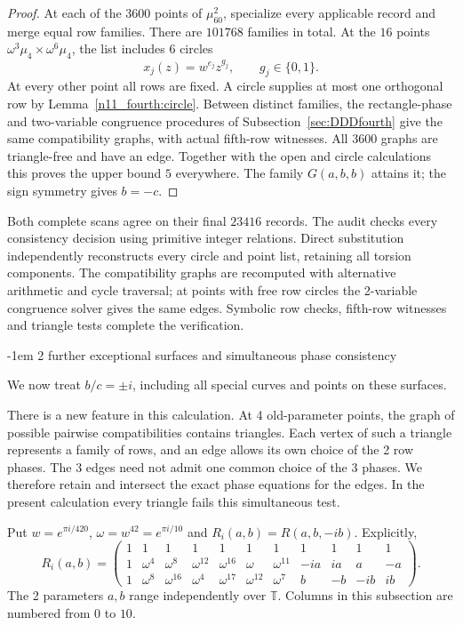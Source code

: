 \documentclass[11pt,a4paper]{article}
\makeatletter
\theoremstyle{plain}
\theoremstyle{definition}
\theoremstyle{plain}
\renewcommand\subsection{\@startsection{subsection}{2}{\z@}  {\medskipamount}  {-1em}  {\normalfont\normalsize\bfseries}}
\makeatother
\begin{document}
\begin{proof}
\medskip
At each of the $3600$ points of $\mu_{60}^2$, specialize every applicable record and merge equal row families. There are $101768$ families in total. At the $16$ points $\omega^3\mu_4\times\omega^6\mu_4$, the list includes $6$ circles
\[
x_j(z)=w^{e_j}z^{g_j},\qquad g_j\in\{0,1\}.
\]
At every other point all rows are fixed. A circle supplies at most one orthogonal row by Lemma~\ref{n11_fourth:circle}. Between distinct families, the rectangle-phase and two-variable congruence procedures of Subsection~\ref{sec:DDDfourth} give the same compatibility graphs, with actual fifth-row witnesses. All $3600$ graphs are triangle-free and have an edge. Together with the open and circle calculations this proves the upper bound $5$ everywhere. The family $G(a,b,b)$ attains it; the sign symmetry gives $b=-c$.
\end{proof}

Both complete scans agree on their final $23416$ records. The audit checks every consistency decision using primitive integer relations. Direct substitution independently reconstructs every circle and point list, retaining all torsion components. The compatibility graphs are recomputed with alternative arithmetic and cycle traversal; at points with free row circles the 2-variable congruence solver gives the same edges. Symbolic row checks, fifth-row witnesses and triangle tests complete the verification.

\subsection{2 further exceptional surfaces and simultaneous phase consistency}\label{sec:DDDImaginary}

We now treat $b/c=\pm i$, including all special curves and points on these surfaces.

There is a new feature in this calculation. At 4 old-parameter points, the graph of possible pairwise compatibilities contains triangles. Each vertex of such a triangle represents a family of rows, and an edge allows its own choice of the 2 row phases. The 3 edges need not admit one common choice of the 3 phases. We therefore retain and intersect the exact phase equations for the edges. In the present calculation every triangle fails this simultaneous test.

Put $w=e^{\pi i/420}$, $\omega=w^{42}=e^{\pi i/10}$ and $R_i(a,b)=R(a,b,-ib)$. Explicitly,
\[
R_i(a,b)=
\begin{pmatrix}
1&1&1&1&1&1&1&1&1&1&1\\
1&\omega^{4}&\omega^{8}&\omega^{12}&\omega^{16}&\omega&\omega^{11}&-ia&ia&a&-a\\
1&\omega^{8}&\omega^{16}&\omega^{4}&\omega^{17}&\omega^{12}&\omega^{7}&b&-b&-ib&ib
\end{pmatrix}.
\]
The 2 parameters $a,b$ range independently over $\mathbb T$. Columns in this subsection are numbered from $0$ to $10$.
\end{document}
